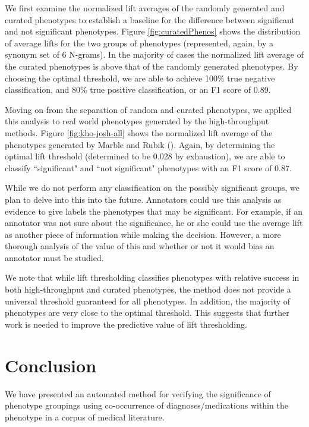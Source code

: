 \documentclass{sig-alternate-05-2015}
\begin{document}
We first examine the normalized lift averages of the randomly generated and curated phenotypes to establish a baseline for the difference between significant and not significant phenotypes. Figure \ref{fig:curatedPhenos} shows the distribution of average lifts for the two groups of phenotypes (represented, again, by a synonym set of 6 N-grams). 
In the majority of cases the normalized lift average of the curated phenotypes is above that of the randomly generated phenotypes. 
By choosing the optimal threshold, we are able to achieve 100\% true negative classification, and 80\% true positive classification, or an F1 score of 0.89. 

Moving on from the separation of random and curated phenotypes, we applied this analysis to real world phenotypes generated by the high-throughput methods. Figure \ref{fig:kho-josh-all} shows the normalized lift average of the phenotypes generated by Marble and Rubik (\cite {Ho:2014jc,Ho:2014da, wang2015rubik}). 
Again, by determining the optimal lift threshold (determined to be 0.028 by exhaustion), we are able to classify ``significant" and ``not significant" phenotypes with an F1 score of 0.87. 

While we do not perform any classification on the possibly significant groups, we plan to delve into this into the future.
Annotators could use this analysis as evidence to give labels the phenotypes that may be significant.
For example, if an annotator was not sure about the significance, he or she could use the average lift as another piece of information while making the decision.
However, a more thorough analysis of the value of this and whether or not it would bias an annotator must be studied.

We note that while lift thresholding classifies phenotypes with relative success in both high-throughput and curated phenotypes, the method does not provide a universal threshold guaranteed for all phenotypes. In addition, the majority of phenotypes are very close to the optimal threshold. This suggests that further work is needed to improve the predictive value of lift thresholding.

\section{Conclusion}
We have presented an automated method for verifying the significance of phenotype groupings using co-occurrence of diagnoses/medications within the phenotype in a corpus of medical literature. 
\end{document}
